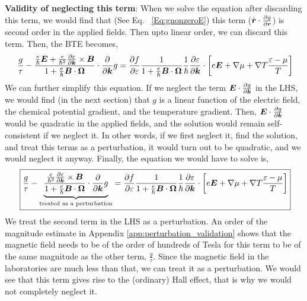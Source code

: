\documentclass{report}
\renewcommand\vec[1]{\ensuremath\boldsymbol{#1}} %
\begin{document}
\textbf{Validity of neglecting this term}: When we solve the equation after discarding this term, we would find that (See Eq. ~\eqref{Eq:gnonzeroE}) this term ($\dot{\vec{r}} \cdot 
 \frac{\partial{g}}{\partial \vec{r}}$) is second order in the applied fields. Then upto linear order, we can discard this term. Then, the BTE becomes,
\begin{equation}~\label{Eq:BTE_semiFinal_Form}
	\frac{g}{\tau} -\frac{\frac{e}{\hbar} \vec{E} + \frac{e}{\hbar^2} \frac{\partial \varepsilon}{\partial \vec{k}} \times \vec{B}}{1 + \frac{e}{\hbar} \vec{B} \cdot \vec{\Omega}} \cdot\frac{\partial}{\partial \vec{k}} g = \frac{\partial f}{\partial \varepsilon}\frac{1}{1 + \frac{e}{\hbar} \vec{B} \cdot \vec{\Omega}}
	\frac{1}{\hbar} \frac{\partial \varepsilon}{\partial \vec{k}}\cdot\left[e \vec{E} + \nabla{\mu} + \nabla T \frac{\varepsilon - \mu}{T}\right]
\end{equation}
We can further simplify this equation. If we neglect the term $\vec{E} \cdot \frac{\partial g}{\partial \vec{k}}$ in the LHS, we would find (in the next section) that $g$ is a linear function of the electric field, the chemical potential gradient, and the temperature gradient. Then, $\vec{E} \cdot \frac{\partial g}{\partial \vec{k}}$ would be quadratic in the applied fields, and the solution would remain self-consistent if we neglect it. In other words, if we first neglect it, find the solution, and treat this terms as a perturbation, it would turn out to be quadratic, and we would neglect it anyway. Finally, the equation we would have to solve is,
\begin{equation}~\label{Eq:BTE_Final_Form}
	\boxed{\frac{g}{\tau} -\underbrace{\frac{\frac{e}{\hbar^2} \frac{\partial \varepsilon}{\partial \vec{k}} \times \vec{B}}{1 + \frac{e}{\hbar} \vec{B} \cdot \vec{\Omega}} \cdot\frac{\partial}{\partial \vec{k}} g}_{\text{treated as a perturbation}} = \frac{\partial f}{\partial \varepsilon}\frac{1}{1 + \frac{e}{\hbar} \vec{B} \cdot \vec{\Omega}}
	\frac{1}{\hbar} \frac{\partial \varepsilon}{\partial \vec{k}}\cdot\left[e \vec{E} + \nabla{\mu} + \nabla T \frac{\varepsilon - \mu}{T}\right]}
\end{equation}
We treat the second term in the LHS as a perturbation. An order of the magnitude estimate in Appendix \ref{app:perturbation_validation} shows that the magnetic field needs to be of the order of hundreds of Tesla for this term to be of the same magnitude as the other term, $\frac{g}{\tau}$. Since the magnetic field in the laboratories are much less than that, we can treat it as a perturbation. We would see that this term gives rise to the (ordinary) Hall effect, that is why we would not completely neglect it.
\end{document}
